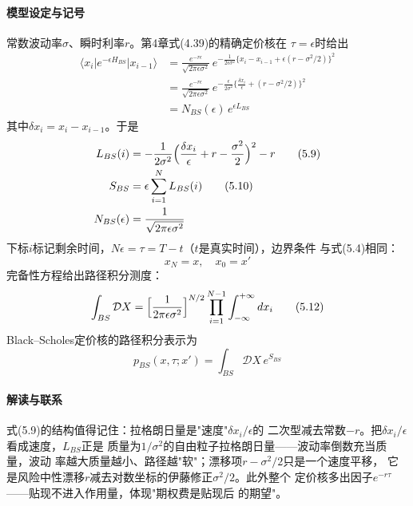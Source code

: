 \paragraph{模型设定与记号}
常数波动率$\sigma$、瞬时利率$r$。第4章式(4.39)的精确定价核在
$\tau=\epsilon$时给出
\begin{align*}
\langle x_{i}\vert e^{-\epsilon H_{BS}}\vert x_{i-1}\rangle
&=\frac{e^{-r\epsilon}}{\sqrt{2\pi\epsilon\sigma^{2}}}\,
e^{-\frac{1}{2\epsilon\sigma^{2}}\{x_{i}-x_{i-1}+\epsilon(r-\sigma^{2}/2)\}^{2}}\\
&=\frac{e^{-r\epsilon}}{\sqrt{2\pi\epsilon\sigma^{2}}}\,
e^{-\frac{\epsilon}{2\sigma^{2}}\{\frac{\delta x_{i}}{\epsilon}
+(r-\sigma^{2}/2)\}^{2}}\\
&=N_{BS}(\epsilon)\,e^{\epsilon L_{BS}}
\end{align*}
其中$\delta x_{i}=x_{i}-x_{i-1}$。于是
\begin{align*}
L_{BS}(i)&=-\frac{1}{2\sigma^{2}}\Bigl(\frac{\delta x_{i}}{\epsilon}
+r-\frac{\sigma^{2}}{2}\Bigr)^{2}-r
\tag{5.9}\\
S_{BS}&=\epsilon\sum_{i=1}^{N}L_{BS}(i)
\tag{5.10}\\
N_{BS}(\epsilon)&=\frac{1}{\sqrt{2\pi\epsilon\sigma^{2}}}
\end{align*}
下标$i$标记剩余时间，$N\epsilon=\tau=T-t$（$t$是真实时间），边界条件
与式(5.4)相同：
\begin{equation*}
x_{N}=x,\quad x_{0}=x'
\tag{5.11}
\end{equation*}
完备性方程给出路径积分测度：
\begin{equation*}
\int_{BS}\mathcal{D}X=\Bigl[\frac{1}{2\pi\epsilon\sigma^{2}}\Bigr]^{N/2}
\prod_{i=1}^{N-1}\int_{-\infty}^{+\infty}dx_{i}
\tag{5.12}
\end{equation*}
Black--Scholes定价核的路径积分表示为
\begin{equation*}
p_{BS}(x,\tau;x')=\int_{BS}\mathcal{D}X\,e^{S_{BS}}
\tag{5.13}
\end{equation*}

\paragraph{解读与联系}
式(5.9)的结构值得记住：拉格朗日量是"速度"$\delta x_{i}/\epsilon$的
二次型减去常数$-r$。把$\delta x_{i}/\epsilon$看成速度，$L_{BS}$正是
质量为$1/\sigma^{2}$的自由粒子拉格朗日量——波动率倒数充当质量，波动
率越大质量越小、路径越"软"；漂移项$r-\sigma^{2}/2$只是一个速度平移，
它是风险中性漂移$r$减去对数坐标的伊藤修正$\sigma^{2}/2$。此外整个
定价核多出因子$e^{-r\tau}$——贴现不进入作用量，体现"期权费是贴现后
的期望"。

